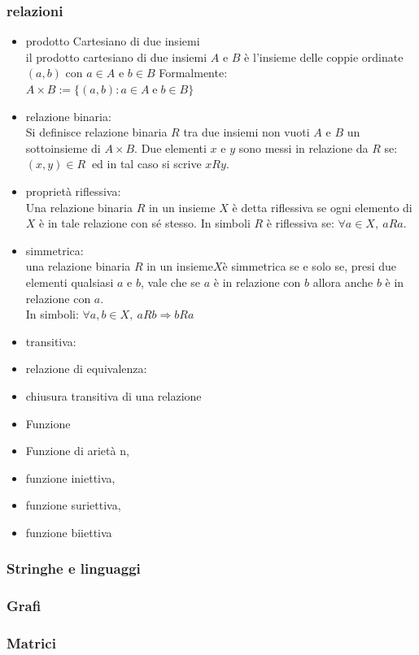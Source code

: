\documentclass[a4paper]{article}
\begin{document}
\subsubsection{relazioni}
\begin{itemize}
	\item prodotto Cartesiano di due insiemi\\
il prodotto cartesiano di due insiemi $A$ e $B$ è l'insieme delle coppie ordinate $(a,b)$ con $a \in A$ e $b \in B$ Formalmente:\\
$A\times B:=\{(a,b):a\in A\;{\mathrm  {e}}\;b\in B\}$ 
	\item relazione binaria:\\
Si definisce relazione binaria $R$ tra due insiemi non vuoti $A$ e $B$ un sottoinsieme di $ A \times B$. Due elementi $x$ e $y$ sono messi in relazione da $R$ se: 
$(x,y)\in R\ $ ed in tal caso si scrive $xRy$.
	\item proprietà riflessiva:\\
Una relazione binaria $R$ in un insieme $X$ è detta riflessiva se ogni elemento di $X$ è in tale relazione con sé stesso.
In simboli $R$ è riflessiva se: $ \forall a\in X,\ aRa.$
	\item simmetrica:\\
una relazione binaria $R$ in un insieme$ X $è simmetrica se e solo se, presi due elementi qualsiasi $a$ e $b$, vale che se $a$ è in relazione con $b$ allora anche $b$ è in relazione con $a$.\\
In simboli: $\forall a,b\in X,\ aRb\Rightarrow bRa$
	\item transitiva:\\

	\item relazione di equivalenza:
	\item chiusura transitiva di una relazione
	\item Funzione
	\item Funzione  di arietà n,
	\item funzione iniettiva,
	\item funzione suriettiva,
	\item funzione biiettiva
\end{itemize}
\subsubsection{Stringhe e linguaggi}
\subsubsection{Grafi}
\subsubsection{Matrici}
\end{document}
